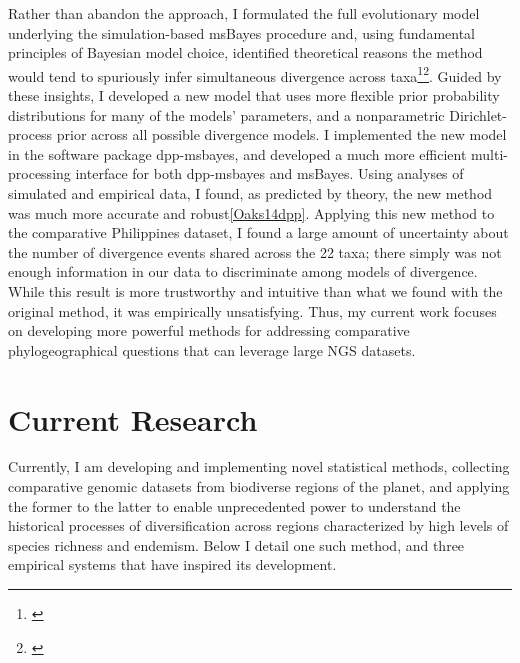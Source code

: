 Rather than abandon the approach, I formulated the full evolutionary model
underlying the simulation-based msBayes procedure and, using fundamental
principles of Bayesian model choice, identified theoretical reasons the method
would tend to spuriously infer simultaneous divergence across
taxa\footnote{\label{Oaks12}}\super{,}\footnote{\label{Oaks14reply}}.
Guided by these insights, I developed a new model that uses more flexible prior
probability distributions for many of the models' parameters, and a
nonparametric Dirichlet-process prior across all possible divergence models.
I implemented the new model in the software package dpp-msbayes, and developed
a much more efficient multi-processing interface for both dpp-msbayes and
msBayes.
Using analyses of simulated and empirical data, I found, as predicted by
theory, the new method was much more accurate and robust\cref{Oaks14dpp}.
Applying this new method to the comparative Philippines dataset, I found a
large amount of uncertainty about the number of divergence events shared across
the 22 taxa; there simply was not enough information in our data to
discriminate among models of divergence.
While this result is more trustworthy and intuitive than what we found
with the original method, it was empirically unsatisfying.
Thus, my current work focuses on developing more powerful methods for
addressing comparative phylogeographical questions that can leverage large NGS
datasets.


\section*{Current Research}
Currently, I am developing and implementing novel statistical methods,
collecting comparative genomic datasets from biodiverse regions of the planet,
and applying the former to the latter to enable unprecedented power to
understand the historical processes of diversification across regions
characterized by high levels of species richness and endemism.
Below I detail one such method, and three empirical systems that have inspired
its development.

